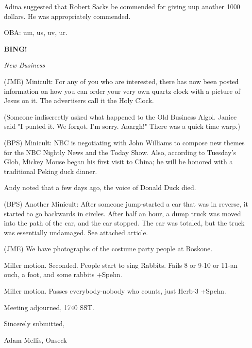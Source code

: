 \documentclass[12pt]{article}
\newcommand{\bing}{{\bf BING!} }
\newcommand{\goto}[1]{\bing \vskip 12pt \centerline{{\em{#1}}}}
\begin{document}
Adina suggested that Robert Sacks be commended for giving uup another 1000 dollars. He was appropriately commended.

OBA: um, us, uv, ur.

\goto{New Business}

(JME) Minicult: For any of you who are interested, there has now been posted information on how you can order your very own quartz clock with a picture of Jesus on it. The advertisers call it the Holy Clock.

(Someone indiscreetly asked what happened to the Old Business Algol. Janice said "I punted it. We forgot. I'm sorry. Aaargh!" There was a quick time warp.)

(BPS) Minicult: NBC is negotiating with John Williams to compose new themes for the NBC Nightly News and the Today Show. Also, according to Tuesday's Glob, Mickey Mouse began his first visit to China; he will be honored with a traditional Peking duck dinner.

Andy noted that a few days ago, the voice of Donald Duck died.

(BPS) Another Minicult: After someone jump-started a car that was in reverse, it started to go backwards in circles. After half an hour, a dump truck was moved into the path of the car, and the car stopped. The car was totaled, but the truck was essentially undamaged. See attached article.

(JME) We have photographs of the costume party people at Boskone.

Miller motion. Seconded. People start to sing Rabbits. Fails 8 or 9-10 or 11-an ouch, a foot, and some rabbits +Spehn.

Miller motion. Passes everybody-nobody who counts, just Herb-3 +Spehn.

\vspace{12pt}

\noindent
Meeting adjourned, 1740 SST.

\vspace{18pt}

\centerline{Sincerely submitted,}
\centerline{Adam Mellis, Onseck}
\end{document}
